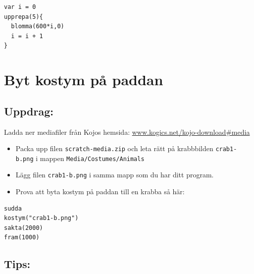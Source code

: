 \begin{lstlisting}[basicstyle={\ttfamily\fontsize{18}{22}\selectfont},numbers=none]
var i = 0          
upprepa(5){
  blomma(600*i,0)
  i = i + 1        
}
\end{lstlisting}
        
\chapter{Byt kostym på paddan}\section*{\color{BrickRed}Uppdrag:}
Ladda ner mediafiler från Kojos hemsida:
\href{http://www.kogics.net/kojo-download#media}{www.kogics.net/kojo-download\#media}


\begin{itemize}

\item {Packa upp filen \lstinline{scratch-media.zip} och leta rätt på krabbbilden \lstinline{crab1-b.png} i mappen \lstinline{Media/Costumes/Animals}}
\item {Lägg filen \lstinline{crab1-b.png} i samma mapp som du har ditt program.}
\item {Prova att byta kostym på paddan till en krabba så här:}

\end{itemize}



  

\begin{lstlisting}[basicstyle={\ttfamily\fontsize{20}{24}\selectfont},numbers=none]
sudda
kostym("crab1-b.png")  
sakta(2000)
fram(1000)
\end{lstlisting}
        
\section*{\color{OliveGreen}Tips:}


